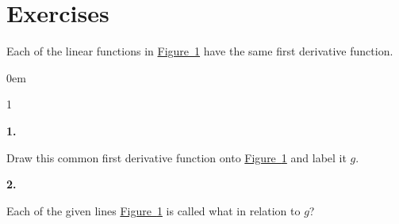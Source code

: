 \documentclass[12pt,]{book}
\theoremstyle{plain}
\theoremstyle{definition}
\numberwithin{equation}{section}
\newenvironment{exercisegroup}%
{\medskip\noindent}%
{\par\bigskip}%
\newlength{\exercisegroupindent}%
\newlength{\exercisegroupitemwidth}%
\newenvironment{exercisegrouplist}%
{\vspace{-\partopsep}%
\begin{adjustwidth}{\exercisegroupindent}{0em}}%
{\end{adjustwidth}%
\vspace{-\partopsep}%
\vspace{\baselineskip}}%
\newenvironment{exercisegroupbycol}[1]%
{\begin{exercisegrouplist}%
\vspace{-\multicolsep}%
\begin{multicols}{#1}%
\setlength{\parindent}{0em}%
\setlength{\exercisegroupitemwidth}{\linewidth}}%
{\end{multicols}%
\vspace{-\multicolsep}%
\end{exercisegrouplist}}%
\newenvironment{exercisegroupitem}[1]%
{\begin{minipage}[t]{\exercisegroupitemwidth}
\vspace{0pt}%
{\bfseries#1}%
\rule{0pt}{\baselineskip}}{\strut%
\end{minipage}%
\hspace{\columnsep}}%
\providecommand\phantomsection{}
\begin{document}
\section*{Exercises}\label{exercises-27}

\begin{exercisegroup}%
Each of the linear functions in \hyperref[figure-parallel-lines]{Figure~\ref*{figure-parallel-lines}} have the same first derivative function.%
\begin{figure}
\centering
{
}
\caption{\label{figure-parallel-lines}}
\end{figure}
\par
\begin{exercisegroupbycol}{1}%
\begin{exercisegroupitem}{1. }\phantomsection\hypertarget{exercise-241}{\null}
Draw this common first derivative function onto \hyperref[figure-parallel-lines]{Figure~\ref*{figure-parallel-lines}} and label it \(g\).%
\end{exercisegroupitem}%
\par%
\begin{exercisegroupitem}{2. }\phantomsection\hypertarget{exercise-242}{\null}
Each of the given lines \hyperref[figure-parallel-lines]{Figure~\ref*{figure-parallel-lines}} is called what in relation to \(g\)?%
\end{exercisegroupitem}%
\par%
\end{exercisegroupbycol}%
\end{exercisegroup}%
\end{document}
